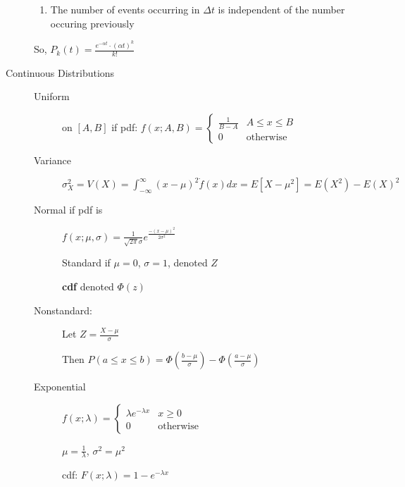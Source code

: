 \documentclass[12pt]{letter}
\begin{document}
\begin{multicols}{2}
\begin{description}
\begin{enumerate}
    \item The number of events occurring in $\Delta t$ is independent of the number occuring previously
    \end{enumerate}

    So, $P_k(t) = \frac{e^{-\alpha t}\cdot (\alpha t)^k}{k!}$

  \item[Continuous Distributions] 
    \begin{description}
      \item[Uniform] on $[A,B]$ if pdf: $f(x; A,B) = \begin{cases}
        \frac{1}{B-A} & A \leq x \leq B \\
        0 & \text{otherwise}
        \end{cases}$
      \item[Variance] $\sigma^2_X = V(X) = \int^\infty_{-\infty} (x - \mu)^2 \dot f(x) dx = E[X-\mu^2] = E(X^2) - E(X)^2$
      \item[Normal if pdf is] $f(x;\mu,\sigma) = \frac{1}{\sqrt{2\pi}\sigma}e^{\frac{-(x-\mu)^2}{2\sigma^2}}$
        
        Standard if $\mu = 0$, $\sigma = 1$, denoted $Z$

        \textbf{cdf} denoted $\Phi(z)$
      \item[Nonstandard:] Let $Z = \frac{X-\mu}{\sigma}$

        Then $P(a \leq x \leq b) = \Phi(\frac{b-\mu}{\sigma}) - \Phi(\frac{a-\mu}{\sigma})$

      \item[Exponential]
        $f(x; \lambda) = \begin{cases}
        \lambda e^{-\lambda x} & x \geq 0 \\
        0 & \text{otherwise}
      \end{cases}$

        $\mu = \frac{1}{\lambda}$, $\sigma^2 = \mu^2$

        cdf: $F(x; \lambda) = 1-e^{-\lambda x}$


\end{description}
\end{description}
\end{multicols}
\end{document}
